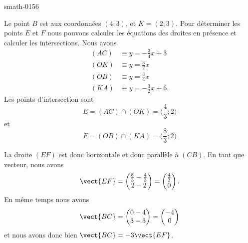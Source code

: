 
\begin{corrige}{smath-0156}

Le point \( B\) est aux coordonnées \( (4;3)\), et \( K=(2;3)\). Pour déterminer les points \( E\) et \( F\) nous pouvons calculer les équations des droites en présence et calculer les intersections. Nous avons
\begin{subequations}
    \begin{align}
        (AC)&\equiv y=-\frac{ 3 }{ 4 }x+3\\
        (OK)&\equiv y=\frac{ 3 }{2}x\\
        (OB)&\equiv y=\frac{ 3 }{ 4 }x\\
        (KA)&\equiv y=-\frac{ 3 }{2}x+6.
    \end{align}
\end{subequations}
Les points d'intersection sont 
\begin{equation}
    E=(AC)\cap (OK)=\big( \frac{ 4 }{ 3 };2 \big)
\end{equation}
et
\begin{equation}
    F=(OB)\cap (KA)=\big( \frac{ 8 }{ 3 };2 \big)
\end{equation}

La droite \( (EF) \) est donc horizontale et donc parallèle à \( (CB)\). En tant que vecteur, nous avons
\begin{equation}
    \vect{ EF }=\begin{pmatrix}
        \frac{ 8 }{ 3 }-\frac{ 4 }{ 3 }    \\ 
        2-2    
    \end{pmatrix}=\begin{pmatrix}
        \frac{ 4 }{ 3 }    \\ 
        0    
    \end{pmatrix}.
\end{equation}
En même temps nous avons
\begin{equation}
    \vect{ BC }=\begin{pmatrix}
        0-4    \\ 
        3-3    
    \end{pmatrix}=\begin{pmatrix}
        -4    \\ 
        0    
    \end{pmatrix}
\end{equation}
et nous avons donc bien \( \vect{ BC }=-3\vect{ EF }\).


\end{corrige}
